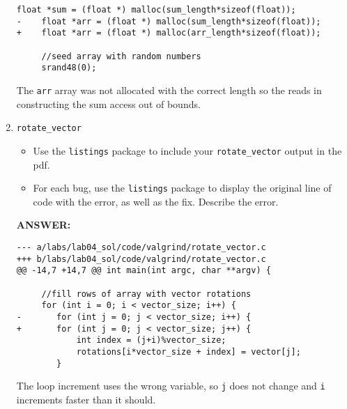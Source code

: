 \begin{enumerate}
\begin{lstlisting}[frame=single]
     float *sum = (float *) malloc(sum_length*sizeof(float));
-    float *arr = (float *) malloc(sum_length*sizeof(float));
+    float *arr = (float *) malloc(arr_length*sizeof(float));
 
     //seed array with random numbers
     srand48(0);

\end{lstlisting}

The \texttt{arr} array was not allocated with the correct length so the reads in constructing the sum access out of bounds.

    \newpage
    \item \texttt{rotate\_vector}
    \begin{itemize}
        \item Use the \texttt{listings} package to include your \texttt{rotate\_vector} output in the pdf.
        \item For each bug, use the \texttt{listings} package to display the original line of code with the error, as well as the fix.  Describe the error.
    \end{itemize}
    \textbf{ANSWER:} %

    
    
\begin{lstlisting}[frame=single]
--- a/labs/lab04_sol/code/valgrind/rotate_vector.c
+++ b/labs/lab04_sol/code/valgrind/rotate_vector.c
@@ -14,7 +14,7 @@ int main(int argc, char **argv) {
 
     //fill rows of array with vector rotations
     for (int i = 0; i < vector_size; i++) {
-       for (int j = 0; j < vector_size; i++) {
+       for (int j = 0; j < vector_size; j++) {
            int index = (j+i)%vector_size;
            rotations[i*vector_size + index] = vector[j];
        }
\end{lstlisting}
    
The loop increment uses the wrong variable, so \texttt{j} does not change and \texttt{i} increments faster than it should.

\end{enumerate}
